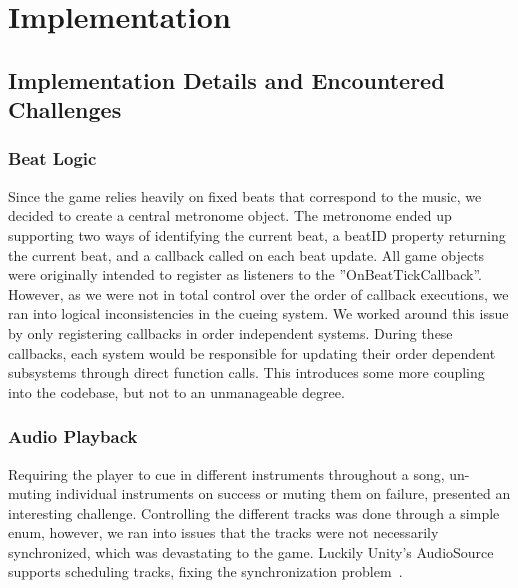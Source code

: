 \chapter{Implementation}
\section{Implementation Details and Encountered Challenges}
\subsection{Beat Logic}
Since the game relies heavily on fixed beats that correspond to the music, we decided to create a central metronome object. The metronome ended up supporting two ways of identifying the current beat, a beatID property returning the current beat, and a callback called on each beat update. All game objects were originally intended to register as listeners to the ''OnBeatTickCallback''. However, as we were not in total control over the order of callback executions, we ran into logical inconsistencies in the cueing system. We worked around this issue by only registering callbacks in order independent systems. During these callbacks, each system would be responsible for updating their order dependent subsystems through direct function calls. This introduces some more coupling into the codebase, but not to an unmanageable degree. 

\subsection{Audio Playback}
Requiring the player to cue in different instruments throughout a song, un-muting individual instruments on success or muting them on failure, presented an interesting challenge. Controlling the different tracks was done through a simple enum, however, we ran into issues that the tracks were not necessarily synchronized, which was devastating to the game. Luckily Unity’s AudioSource supports scheduling tracks, fixing the synchronization problem~\cite{unity_audio_source_api}. 

